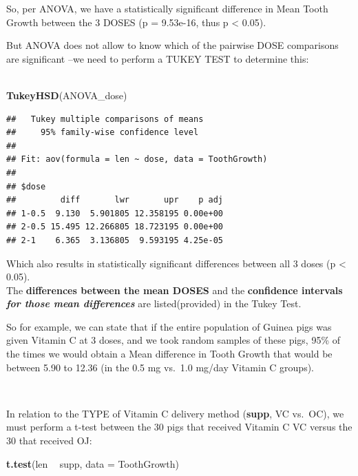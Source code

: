 \documentclass[]{article}
\newenvironment{Shaded}{\begin{snugshade}}{\end{snugshade}}
\newcommand{\DataTypeTok}[1]{\textcolor[rgb]{0.13,0.29,0.53}{#1}}
\newcommand{\KeywordTok}[1]{\textcolor[rgb]{0.13,0.29,0.53}{\textbf{#1}}}
\newcommand{\NormalTok}[1]{#1}
\newcommand{\OperatorTok}[1]{\textcolor[rgb]{0.81,0.36,0.00}{\textbf{#1}}}
\newcommand{\StringTok}[1]{\textcolor[rgb]{0.31,0.60,0.02}{#1}}
\begin{document}
So, per ANOVA, we have a statistically significant difference in Mean
Tooth Growth between the 3 DOSES (p = 9.53e-16, thus p \textless{}
0.05).

But ANOVA does not allow to know which of the pairwise DOSE comparisons
are significant --we need to perform a TUKEY TEST to determine this:\\
\hspace*{0.333em}\\
\hspace*{0.333em}

\begin{Shaded}
\begin{Highlighting}[]
\KeywordTok{TukeyHSD}\NormalTok{(ANOVA_dose)}
\end{Highlighting}
\end{Shaded}

\begin{verbatim}
##   Tukey multiple comparisons of means
##     95% family-wise confidence level
## 
## Fit: aov(formula = len ~ dose, data = ToothGrowth)
## 
## $dose
##         diff       lwr       upr    p adj
## 1-0.5  9.130  5.901805 12.358195 0.00e+00
## 2-0.5 15.495 12.266805 18.723195 0.00e+00
## 2-1    6.365  3.136805  9.593195 4.25e-05
\end{verbatim}

Which also results in statistically significant differences between all
3 doses (p \textless{} 0.05).\\
The \textbf{differences between the mean DOSES} and the
\textbf{confidence intervals \emph{for those mean differences} } are
listed(provided) in the Tukey Test.

So for example, we can state that if the entire population of Guinea
pigs was given Vitamin C at 3 doses, and we took random samples of these
pigs, 95\% of the times we would obtain a Mean difference in Tooth
Growth that would be between 5.90 to 12.36 (in the 0.5 mg vs.~1.0 mg/day
Vitamin C groups).

\break

~

In relation to the TYPE of Vitamin C delivery method (\textbf{supp}, VC
vs.~OC), we must perform a t-test between the 30 pigs that received
Vitamin C VC versus the 30 that received OJ:

\begin{Shaded}
\begin{Highlighting}[]
\KeywordTok{t.test}\NormalTok{(len }\OperatorTok{~}\StringTok{ }\NormalTok{supp, }\DataTypeTok{data =}\NormalTok{ ToothGrowth)}
\end{Highlighting}
\end{Shaded}
\end{document}
